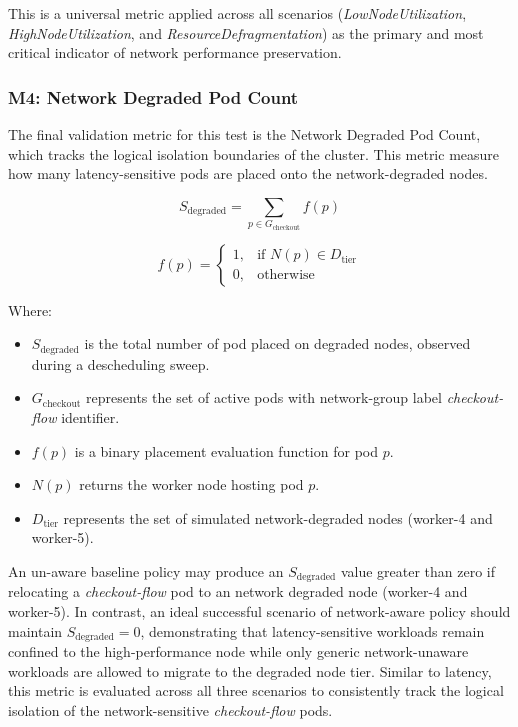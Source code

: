 This is a universal metric applied across all scenarios (\textit{LowNodeUtilization}, \textit{HighNodeUtilization}, and \textit{ResourceDefragmentation}) as the primary and most critical indicator of network performance preservation.

\subsubsection{M4: Network Degraded Pod Count}
\label{subsubsec:netaware4_evaluationmetrics4}
The final validation metric for this test is the Network Degraded Pod Count, which tracks the logical isolation boundaries of the cluster. This metric measure how many latency-sensitive pods are placed onto the network-degraded nodes.

\[
S_{\text{degraded}}
=
\sum_{p \in G_{\text{checkout}}} f(p)
\]

\[
f(p)
=
\begin{cases}
1, & \text{if } N(p) \in D_{\text{tier}} \\
0, & \text{otherwise}
\end{cases}
\]

Where:

\begin{itemize}
    \item \(S_{\text{degraded}}\) is the total number of pod placed on degraded nodes, observed during a descheduling sweep.

    \item \(G_{\text{checkout}}\) represents the set of active pods with network-group label \textit{checkout-flow} identifier.

    \item \(f(p)\) is a binary placement evaluation function for pod \(p\).

    \item \(N(p)\) returns the worker node hosting pod \(p\).

    \item \(D_{\text{tier}}\) represents the set of simulated network-degraded nodes (worker-4 and worker-5).
\end{itemize}

An un-aware baseline policy may produce an \(S_{\text{degraded}}\) value greater than zero if relocating a \textit{checkout-flow} pod to an network degraded node (worker-4 and worker-5). In contrast, an ideal successful scenario of network-aware policy should maintain \(S_{\text{degraded}} = 0\), demonstrating that latency-sensitive workloads remain confined to the high-performance node while only generic network-unaware workloads are allowed to migrate to the degraded node tier. Similar to latency, this metric is evaluated across all three scenarios to consistently track the logical isolation of the network-sensitive \textit{checkout-flow} pods.

